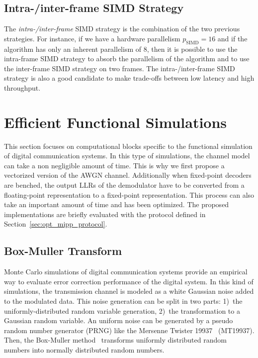 \subsection{Intra-/inter-frame SIMD Strategy}

The \emph{intra-/inter-frame} SIMD strategy is the combination of the two
previous strategies. For instance, if we have a hardware parallelism
$p_\text{SIMD} = 16$ and if the algorithm has only an inherent parallelism of
8, then it is possible to use the intra-frame SIMD strategy to absorb the
parallelism of the algorithm and to use the inter-frame SIMD strategy on two
frames. The intra-/inter-frame SIMD strategy is also a good candidate to make
trade-offs between low latency and high throughput.

\section{Efficient Functional Simulations}
\label{sec:opt_simu}

This section focuses on computational blocks specific to the functional
simulation of digital communication systems. In this type of simulations,
the channel model can take a non negligible amount of time. This is why we
first propose a vectorized version of the AWGN channel. Additionally when
fixed-point decoders are benched, the output LLRs of the demodulator have to be
converted from a floating-point representation to a fixed-point representation.
This process can also take an important amount of time and has been optimized.
The proposed implementations are briefly evaluated with the protocol defined in
Section~\ref{sec:opt_mipp_protocol}.

\subsection{Box-Muller Transform}
\label{sec:opt_simu_awgn}

Monte Carlo simulations of digital communication systems provide an empirical
way to evaluate error correction performance of the digital system. In this kind
of simulations, the transmission channel is modeled as a white Gaussian noise
added to the modulated data. This noise generation can be split in two parts:
1)~the uniformly-distributed random variable generation, 2)~the transformation
to a Gaussian random variable. An uniform noise can be generated by a pseudo
random number generator (PRNG) like the Mersenne Twister
19937~\cite{Matsumoto1998} (MT19937). Then, the Box-Muller method~\cite{Box1958}
transforms uniformly distributed random numbers into normally distributed random
numbers.

